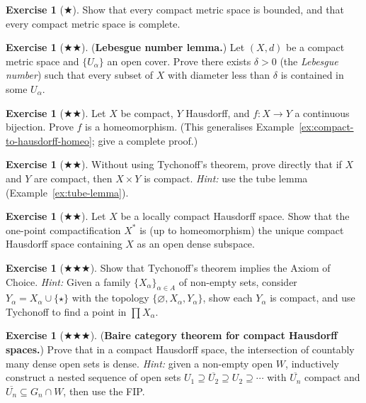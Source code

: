 \documentclass[11pt,a4paper,twoside]{book}
\theoremstyle{remark}
\theoremstyle{definition}
\newtheorem{exerciseplain}[theorem]{Exercise}
\theoremstyle{definition}
\newenvironment{exercise}[1][]{%
  \begin{exerciseplain}[#1]
}{%
  \end{exerciseplain}
}
\begin{document}
\begin{exercise}[$\bigstar$]\label{exo:compact-metric-bounded}
Show that every compact metric space is bounded, and that every compact metric
space is complete.
\end{exercise}

\begin{exercise}[$\bigstar\bigstar$]\label{exo:lebesgue-number}
(\textbf{Lebesgue number lemma.})
Let $(X,d)$ be a compact metric space and $\{U_\alpha\}$ an open cover.
Prove there exists $\delta > 0$ (the \emph{Lebesgue number}) such that every
subset of $X$ with diameter less than $\delta$ is contained in some
$U_\alpha$.
\end{exercise}

\begin{exercise}[$\bigstar\bigstar$]\label{exo:compact-hausdorff-homeo}
Let $X$ be compact, $Y$ Hausdorff, and $f \colon X \to Y$ a continuous
bijection.  Prove $f$ is a homeomorphism.
(This generalises Example~\ref{ex:compact-to-hausdorff-homeo}; give a
complete proof.)
\end{exercise}

\begin{exercise}[$\bigstar\bigstar$]\label{exo:compact-product-finite}
Without using Tychonoff's theorem, prove directly that if $X$ and $Y$ are
compact, then $X \times Y$ is compact.
\emph{Hint:} use the tube lemma (Example~\ref{ex:tube-lemma}).
\end{exercise}

\begin{exercise}[$\bigstar\bigstar$]\label{exo:one-point-compact-characterise}
Let $X$ be a locally compact Hausdorff space.  Show that the one-point
compactification $X^*$ is (up to homeomorphism) the unique compact Hausdorff
space containing $X$ as an open dense subspace.
\end{exercise}

\begin{exercise}[$\bigstar\bigstar\bigstar$]\label{exo:tychonoff-equiv-ac}
Show that Tychonoff's theorem implies the Axiom of Choice.
\emph{Hint:} Given a family $\{X_\alpha\}_{\alpha \in A}$ of non-empty sets,
consider $Y_\alpha = X_\alpha \cup \{\star\}$ with the topology
$\{\varnothing, X_\alpha, Y_\alpha\}$, show each $Y_\alpha$ is compact, and
use Tychonoff to find a point in $\prod X_\alpha$.
\end{exercise}

\begin{exercise}[$\bigstar\bigstar\bigstar$]\label{exo:baire-compact}
(\textbf{Baire category theorem for compact Hausdorff spaces.})%
Prove that in a compact Hausdorff space, the intersection of countably many
dense open sets is dense.
\emph{Hint:} given a non-empty open $W$, inductively construct a nested
sequence of open sets $U_1 \supseteq \overline{U_2} \supseteq U_2 \supseteq
\cdots$ with $\overline{U_n}$ compact and $\overline{U_n} \subseteq G_n \cap W$,
then use the FIP.
\end{exercise}
\end{document}

